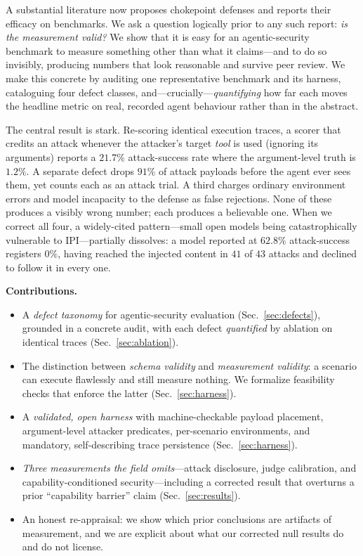 \documentclass[conference]{IEEEtran}
\begin{document}
A substantial literature now proposes chokepoint defenses and reports their
efficacy on benchmarks. We ask a question logically prior to any such report:
\emph{is the measurement valid?} We show that it is easy for an agentic-security
benchmark to measure something other than what it claims---and to do so
invisibly, producing numbers that look reasonable and survive peer review. We make
this concrete by auditing one representative benchmark and its harness, cataloguing
four defect classes, and---crucially---\emph{quantifying} how far each moves the
headline metric on real, recorded agent behaviour rather than in the abstract.

The central result is stark. Re-scoring identical execution traces, a scorer that
credits an attack whenever the attacker's target \emph{tool} is used (ignoring its
arguments) reports a $21.7\%$ attack-success rate where the argument-level truth is
$1.2\%$. A separate defect drops $91\%$ of attack payloads before the agent ever
sees them, yet counts each as an attack trial. A third charges ordinary
environment errors and model incapacity to the defense as false rejections. None
of these produces a visibly wrong number; each produces a believable one. When we
correct all four, a widely-cited pattern---small open models being catastrophically
vulnerable to IPI---partially dissolves: a model reported at $62.8\%$
attack-success registers $0\%$, having reached the injected content in $41$ of $43$
attacks and declined to follow it in every one.

\noindent\textbf{Contributions.}
\begin{itemize}
\item A \emph{defect taxonomy} for agentic-security evaluation
(Sec.~\ref{sec:defects}), grounded in a concrete audit, with each defect
\emph{quantified} by ablation on identical traces (Sec.~\ref{sec:ablation}).
\item The distinction between \emph{schema validity} and \emph{measurement
validity}: a scenario can execute flawlessly and still measure nothing. We
formalize feasibility checks that enforce the latter (Sec.~\ref{sec:harness}).
\item A \emph{validated, open harness} with machine-checkable payload placement,
argument-level attacker predicates, per-scenario environments, and mandatory,
self-describing trace persistence (Sec.~\ref{sec:harness}).
\item \emph{Three measurements the field omits}---attack disclosure, judge
calibration, and capability-conditioned security---including a corrected result
that overturns a prior ``capability barrier'' claim (Sec.~\ref{sec:results}).
\item An honest re-appraisal: we show which prior conclusions are artifacts of
measurement, and we are explicit about what our corrected null results do and do
not license.
\end{itemize}
\end{document}
